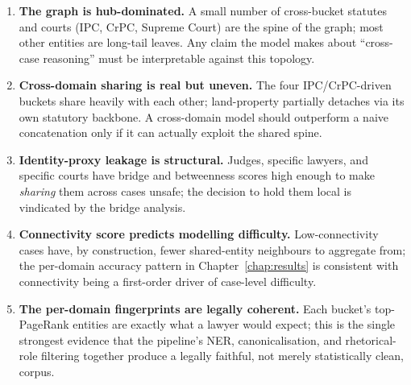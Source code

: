 \begin{enumerate}
  \item \textbf{The graph is hub-dominated.} A small number of
    cross-bucket statutes and courts (IPC, CrPC, Supreme Court) are
    the spine of the graph; most other entities are long-tail leaves.
    Any claim the model makes about ``cross-case reasoning'' must be
    interpretable against this topology.
  \item \textbf{Cross-domain sharing is real but uneven.} The four
    IPC/CrPC-driven buckets share heavily with each other; land-property
    partially detaches via its own statutory backbone. A cross-domain
    model should outperform a naive concatenation only if it can
    actually exploit the shared spine.
  \item \textbf{Identity-proxy leakage is structural.} Judges,
    specific lawyers, and specific courts have bridge and betweenness
    scores high enough to make \emph{sharing} them across cases
    unsafe; the decision to hold them local is vindicated by the
    bridge analysis.
  \item \textbf{Connectivity score predicts modelling difficulty.}
    Low-connectivity cases have, by construction, fewer shared-entity
    neighbours to aggregate from; the per-domain accuracy pattern in
    Chapter~\ref{chap:results} is consistent with connectivity being a
    first-order driver of case-level difficulty.
  \item \textbf{The per-domain fingerprints are legally coherent.}
    Each bucket's top-PageRank entities are exactly what a lawyer
    would expect; this is the single strongest evidence that the
    pipeline's NER, canonicalisation, and rhetorical-role filtering
    together produce a legally faithful, not merely statistically
    clean, corpus.
\end{enumerate}
